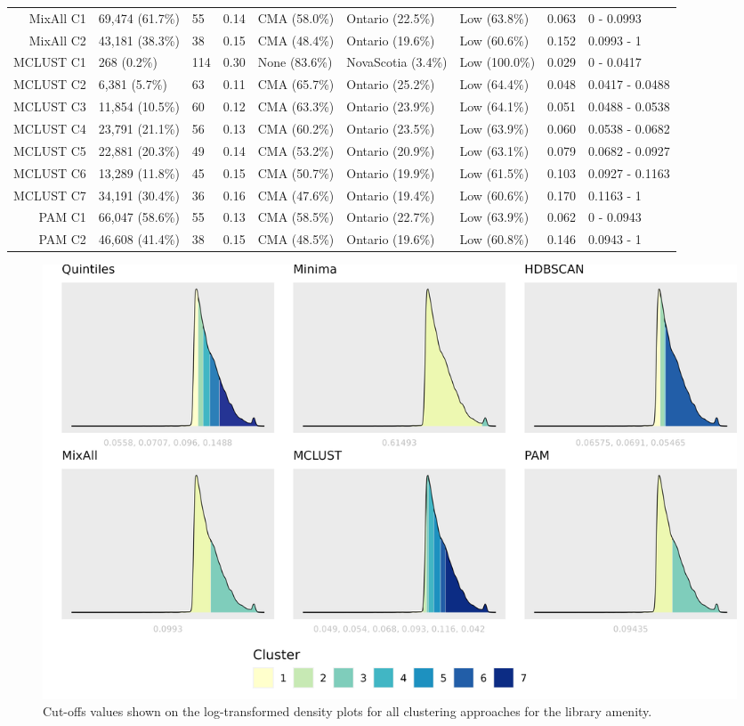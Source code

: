 \documentclass[11pt, a4paper]{article}
\begin{document}
\begin{table}[H]
{\begin{tabular}{|r|llllllll|}
  MixAll C1 & 69,474 (61.7\%) & 55 & 0.14 & CMA (58.0\%) & Ontario (22.5\%) & Low (63.8\%) & 0.063 & 0 - 0.0993 \\
  MixAll C2 & 43,181 (38.3\%) & 38 & 0.15 & CMA (48.4\%) & Ontario (19.6\%) & Low (60.6\%) & 0.152 & 0.0993 - 1 \\
\rowcolor{gray!25}  MCLUST C1 & 268 (0.2\%) & 114 & 0.30 & None (83.6\%) & NovaScotia (3.4\%) & Low (100.0\%) & 0.029 & 0 - 0.0417 \\
\rowcolor{gray!25}  MCLUST C2 & 6,381 (5.7\%) & 63 & 0.11 & CMA (65.7\%) & Ontario (25.2\%) & Low (64.4\%) & 0.048 & 0.0417 - 0.0488 \\
\rowcolor{gray!25}  MCLUST C3 & 11,854 (10.5\%) & 60 & 0.12 & CMA (63.3\%) & Ontario (23.9\%) & Low (64.1\%) & 0.051 & 0.0488 - 0.0538 \\
 \rowcolor{gray!25} MCLUST C4 & 23,791 (21.1\%) & 56 & 0.13 & CMA (60.2\%) & Ontario (23.5\%) & Low (63.9\%) & 0.060 & 0.0538 - 0.0682 \\
 \rowcolor{gray!25} MCLUST C5 & 22,881 (20.3\%) & 49 & 0.14 & CMA (53.2\%) & Ontario (20.9\%) & Low (63.1\%) & 0.079 & 0.0682 - 0.0927 \\
\rowcolor{gray!25}  MCLUST C6 & 13,289 (11.8\%) & 45 & 0.15 & CMA (50.7\%) & Ontario (19.9\%) & Low (61.5\%) & 0.103 & 0.0927 - 0.1163 \\
\rowcolor{gray!25}  MCLUST C7 & 34,191 (30.4\%) & 36 & 0.16 & CMA (47.6\%) & Ontario (19.4\%) & Low (60.6\%) & 0.170 & 0.1163 - 1 \\
  PAM C1 & 66,047 (58.6\%) & 55 & 0.13 & CMA (58.5\%) & Ontario (22.7\%) & Low (63.9\%) & 0.062 & 0 - 0.0943 \\
  PAM C2 & 46,608 (41.4\%) & 38 & 0.15 & CMA (48.5\%) & Ontario (19.6\%) & Low (60.8\%) & 0.146 & 0.0943 - 1 \\
   \hline
\end{tabular}
}
\end{table}





\begin{figure}[H]
\centering
\includegraphics[width=\textwidth]{./cutoffs/by_amenity/Library_cutoffs.png}
\caption[Library cutoffs]{Cut-offs values shown on the log-transformed density plots for all clustering approaches for the library amenity.}\label{librarycutoffs}
\end{figure}
\end{document}
